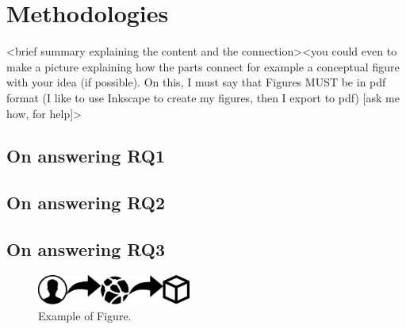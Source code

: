 \section{Methodologies}
<brief summary explaining the content and the connection><you could even to make a picture explaining how the parts connect for example a conceptual figure with your idea (if possible). On this, I must say that Figures MUST be in pdf format (I like to use Inkscape to create my figures, then I export to pdf) [ask me how, for help]> 

\subsection{On answering RQ1}

\subsection{On answering RQ2}

\subsection{On answering RQ3}
\begin{figure}[h!]
	\label{fig:approach}
	\centering
	\includegraphics[width=0.45\textwidth]{figs/example.eps}
	\caption{Example of Figure.}
\end{figure}
